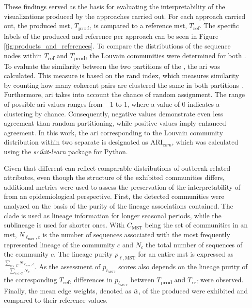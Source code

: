 These findings served as the basis for evaluating the interpretability of the visualizations produced by the approaches carried out. For each approach carried out, the produced \acrshort{mst}, $T$\textsubscript{prod}, is compared to a reference \acrshort{mst}, $T$\textsubscript{ref}. The specific labels of the produced and reference  per approach can be seen in Figure \ref{fig:products_and_references}. To compare the distributions of the sequence nodes within $T$\textsubscript{ref} and $T$\textsubscript{prod}, the Louvain communities were determined for both .
To evaluate the similarity between the two partitions of the , the \acrfull{ari} was calculated. This measure is based on the rand index, which measures similarity by counting how many coherent pairs are clustered the same in both partitions \cite{Sun1}. Furthermore, \acrshort{ari} takes into account the chance of random assignment. The range of possible \acrshort{ari}  values ranges from $-1$ to $1$, where a value of 0 indicates a clustering by chance. Consequently, negative values demonstrate even less agreement than random partitioning, while positive values imply enhanced agreement. In this work, the \acrshort{ari} corresponding to the Louvain community distribution within two separate  is designated as $\text{ARI}_{com}$, which was calculated using the \textit{scikit-learn} package \cite{Sci1} for Python.

Given that different  can reflect comparable distributions of outbreak-related attributes, even though the structure of the exhibited communities differs, additional metrics were used to assess the preservation of the interpretability of  from an epidemiological perspective. First, the detected communities were analyzed on the basis of the purity of the lineage associations contained. 
The clade is used as lineage information for longer seasonal periods, while the sublineage is used for shorter ones. With $C_{\text{MST}}$ being the set of communities in an \acrshort{mst}, $N_{\ell_{\max},c}$ is the number of sequences associated with the most frequently represented lineage of the community $c$ and $N_c$ the total number of sequences of the community $c$. 
The lineage purity $p_{\ell,{\text{MST}}}$ for an entire \acrshort{mst} is expressed as $\frac{\sum_{c\in C}N_{\ell_{\max},c}}{\sum_{c\in C}N_c}$. As the assessment of $p_{\ell_{\text{MST}}}$ scores also depends on the lineage purity of the corresponding $T$\textsubscript{ref}, differences in $p_{\ell_{\text{MST}}}$ between $T$\textsubscript{prod} and $T$\textsubscript{ref} were observed. Finally, the mean edge weights, denoted as $\bar w$, of the produced  were exhibited and compared to their reference values.

